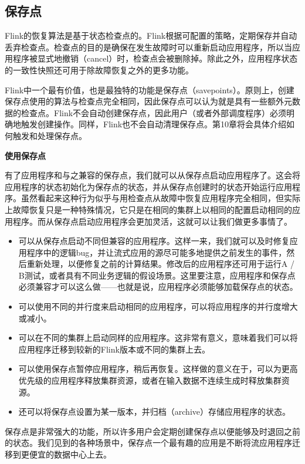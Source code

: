 \documentclass[cn,11pt,chinese]{elegantbook}
\providecommand{\tightlist}{%
  \setlength{\itemsep}{0pt}\setlength{\parskip}{0pt}}
\begin{document}
\hypertarget{ux4fddux5b58ux70b9}{%
\subsection{保存点}\label{ux4fddux5b58ux70b9}}

Flink的恢复算法是基于状态检查点的。Flink根据可配置的策略，定期保存并自动丢弃检查点。检查点的目的是确保在发生故障时可以重新启动应用程序，所以当应用程序被显式地撤销（cancel）时，检查点会被删除掉。除此之外，应用程序状态的一致性快照还可用于除故障恢复之外的更多功能。

Flink中一个最有价值，也是最独特的功能是保存点（savepoints）。原则上，创建保存点使用的算法与检查点完全相同，因此保存点可以认为就是具有一些额外元数据的检查点。Flink不会自动创建保存点，因此用户（或者外部调度程序）必须明确地触发创建操作。同样，Flink也不会自动清理保存点。第10章将会具体介绍如何触发和处理保存点。

\textbf{使用保存点}

有了应用程序和与之兼容的保存点，我们就可以从保存点启动应用程序了。这会将应用程序的状态初始化为保存点的状态，并从保存点创建时的状态开始运行应用程序。虽然看起来这种行为似乎与用检查点从故障中恢复应用程序完全相同，但实际上故障恢复只是一种特殊情况，它只是在相同的集群上以相同的配置启动相同的应用程序。而从保存点启动应用程序会更加灵活，这就可以让我们做更多事情了。

\begin{itemize}
\tightlist
\item
  可以从保存点启动不同但兼容的应用程序。这样一来，我们就可以及时修复应用程序中的逻辑bug，并让流式应用的源尽可能多地提供之前发生的事件，然后重新处理，以便修复之前的计算结果。修改后的应用程序还可用于运行A
  /
  B测试，或者具有不同业务逻辑的假设场景。这里要注意，应用程序和保存点必须兼容才可以这么做------也就是说，应用程序必须能够加载保存点的状态。
\item
  可以使用不同的并行度来启动相同的应用程序，可以将应用程序的并行度增大或减小。
\item
  可以在不同的集群上启动同样的应用程序。这非常有意义，意味着我们可以将应用程序迁移到较新的Flink版本或不同的集群上去。
\item
  可以使用保存点暂停应用程序，稍后再恢复。这样做的意义在于，可以为更高优先级的应用程序释放集群资源，或者在输入数据不连续生成时释放集群资源。
\item
  还可以将保存点设置为某一版本，并归档（archive）存储应用程序的状态。
\end{itemize}

保存点是非常强大的功能，所以许多用户会定期创建保存点以便能够及时退回之前的状态。我们见到的各种场景中，保存点一个最有趣的应用是不断将流应用程序迁移到更便宜的数据中心上去。
\end{document}
